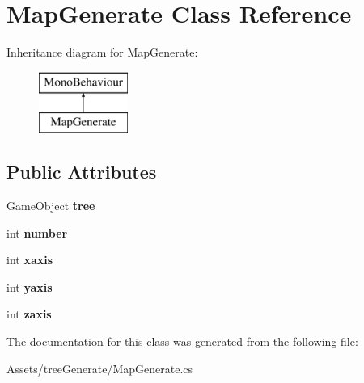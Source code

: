 \hypertarget{class_map_generate}{}\section{Map\+Generate Class Reference}
\label{class_map_generate}
Inheritance diagram for Map\+Generate\+:\begin{figure}[H]
\begin{center}
\leavevmode
\includegraphics[height=2.000000cm]{class_map_generate}
\end{center}
\end{figure}
\subsection*{Public Attributes}
\begin{DoxyCompactItemize}
\item 
\mbox{\label{class_map_generate_af9494468ae07d421dde634ca1f410850}} 
Game\+Object {\bfseries tree}
\item 
\mbox{\label{class_map_generate_a037de1b949f0bf81871d1aba4bc167b9}} 
int {\bfseries number}
\item 
\mbox{\label{class_map_generate_a27e7f5aeac716f9a7ba1fac63183c655}} 
int {\bfseries xaxis}
\item 
\mbox{\label{class_map_generate_a8b4ca903ee45ebaf5b732f9432fa2273}} 
int {\bfseries yaxis}
\item 
\mbox{\label{class_map_generate_a373416541a633f315fdc58479ac3ab6d}} 
int {\bfseries zaxis}
\end{DoxyCompactItemize}


The documentation for this class was generated from the following file\+:\begin{DoxyCompactItemize}
\item 
Assets/tree\+Generate/Map\+Generate.\+cs\end{DoxyCompactItemize}
